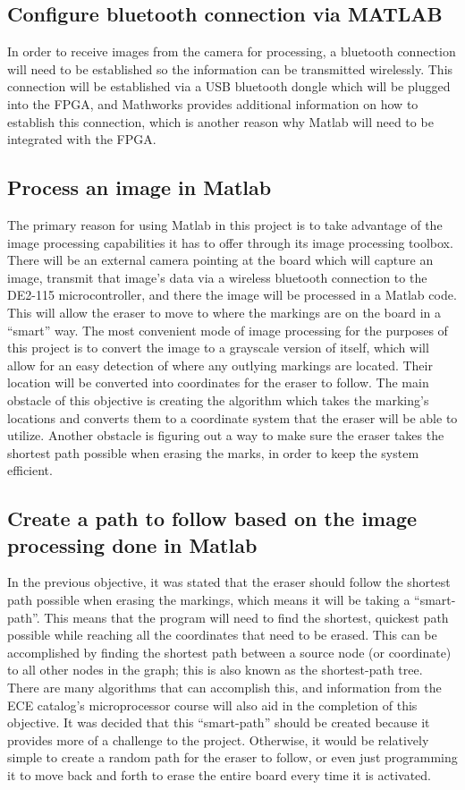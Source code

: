 \documentclass{IEEEtran}					%
\begin{document}
	\subsection{Configure bluetooth connection via MATLAB}
	In order to receive images from the camera for processing, a bluetooth connection will need to be established so the information can be transmitted wirelessly. This connection will be established via a USB bluetooth dongle which will be plugged into the FPGA, and Mathworks provides additional information on how to establish this connection, which is another reason why Matlab will need to be integrated with the FPGA.
	\subsection{Process an image in Matlab}
	The primary reason for using Matlab in this project is to take advantage of the image processing capabilities it has to offer through its image processing toolbox. There will be an external camera pointing at the board which will capture an image, transmit that image{\rq}s data via a wireless bluetooth connection to the DE2-115 microcontroller, and there the image will be processed in a Matlab code. This will allow the eraser to move to where the markings are on the board in a ``smart'' way. The most convenient mode of image processing for the purposes of this project is to convert the image to a grayscale version of itself, which will allow for an easy detection of where any outlying markings are located. Their location will be converted into coordinates for the eraser to follow. The main obstacle of this objective is creating the algorithm which takes the marking{\rq}s locations and converts them to a coordinate system that the eraser will be able to utilize. Another obstacle is figuring out a way to make sure the eraser takes the shortest path possible when erasing the marks, in order to keep the system efficient.
	
	\subsection{Create a path to follow based on the image processing done in Matlab}
	In the previous objective, it was stated that the eraser should follow the shortest path possible when erasing the markings, which means it will be taking a ``smart-path''. This means that the program will need to find the shortest, quickest path possible while reaching all the coordinates that need to be erased. This can be accomplished by finding the shortest path between a source node (or coordinate) to all other nodes in the graph; this is also known as the shortest-path tree. There are many algorithms that can accomplish this, and information from the ECE catalog{\rq}s microprocessor course will also aid in the completion of this objective. It was decided that this ``smart-path'' should be created because it provides more of a challenge to the project. Otherwise, it would be relatively simple to create a random path for the eraser to follow, or even just programming it to move back and forth to erase the entire board every time it is activated.
	
\end{document}
